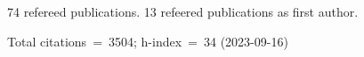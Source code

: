 74 refereed publications. 13 refeered publications as first author.

Total citations~=~3504; h-index~=~34 (2023-09-16)